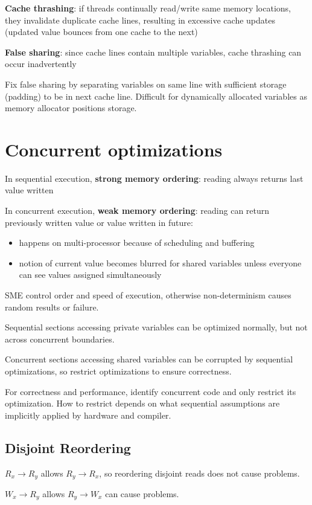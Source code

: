 \documentclass[11pt]{article}
\begin{document}
\textbf{Cache thrashing}: if threads continually read/write same memory locations, they invalidate
duplicate cache lines, resulting in excessive cache updates (updated value bounces from one
cache to the next)

\textbf{False sharing}: since cache lines contain multiple variables, cache thrashing can occur inadvertently

Fix false sharing by separating variables on same line with sufficient storage (padding) to be
in next cache line.
Difficult for dynamically allocated variables as memory allocator positions storage.
\section{Concurrent optimizations}
\label{sec:orgb41b982}
In sequential execution, \textbf{strong memory ordering}: reading always returns last value written

In concurrent execution, \textbf{weak memory ordering}: reading can return previously written value or
value written in future:
\begin{itemize}
\item happens on multi-processor because of scheduling and buffering
\item notion of current value becomes blurred for shared variables unless everyone can see values
assigned simultaneously
\end{itemize}

SME control order and speed of execution, otherwise non-determinism causes random results or failure.

Sequential sections accessing private variables can be optimized normally, but not across concurrent
boundaries.

Concurrent sections accessing shared variables can be corrupted by sequential optimizations, so restrict
optimizations to ensure correctness.

For correctness and performance, identify concurrent code and only restrict its optimization.
How to restrict depends on what sequential assumptions are implicitly applied by hardware and compiler.
\subsection{Disjoint Reordering}
\label{sec:orgfb0fda4}
\(R_{x} \to R_{y}\) allows \(R_{y} \to R_{x}\), so reordering disjoint reads does not cause problems.

\(W_{x} \to R_{y}\) allows \(R_{y} \to W_{x}\) can cause problems.
\end{document}
